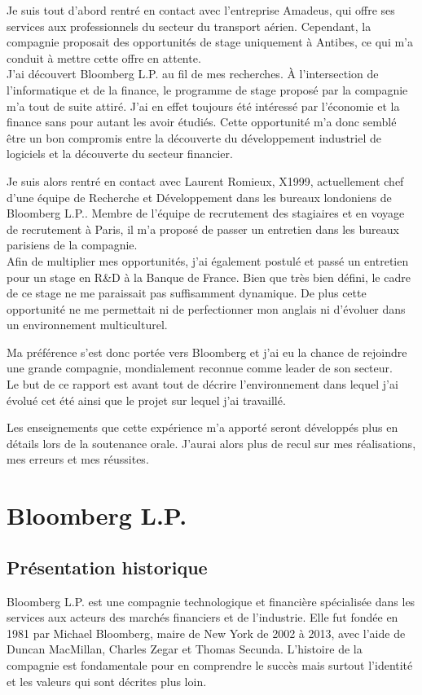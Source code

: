 \documentclass[11pt, oneside, titlepage, a4paper]{article}
\begin{document}
Je suis tout d'abord rentré en contact avec l'entreprise Amadeus, qui offre ses services aux professionnels du secteur du transport aérien. Cependant, la compagnie proposait des opportunités de stage uniquement à Antibes, ce qui m'a conduit à mettre cette offre en attente.
\\

J'ai découvert Bloomberg L.P. au fil de mes recherches. À l'intersection de l'informatique et de la finance, le programme de stage proposé par la compagnie m'a tout de suite attiré. J'ai en effet toujours été intéressé par l'économie et la finance  sans pour autant les avoir étudiés. Cette opportunité m'a donc semblé être un bon compromis entre la découverte du développement industriel de logiciels et la découverte du secteur financier.

Je suis alors rentré en contact avec Laurent Romieux, X1999, actuellement chef d'une équipe de Recherche et Développement dans les bureaux londoniens de Bloomberg L.P.. Membre de l'équipe de recrutement des stagiaires et en voyage de recrutement à Paris, il m'a proposé de passer un entretien dans les bureaux parisiens de la compagnie.
\\

Afin de multiplier mes opportunités, j'ai également postulé et passé un entretien pour un stage en R\&D à la Banque de France. Bien que très bien défini, le cadre de ce stage ne me paraissait pas suffisamment dynamique. De plus cette opportunité ne me permettait ni de perfectionner mon anglais ni d'évoluer dans un environnement multiculturel.

Ma préférence s'est donc portée vers Bloomberg et j'ai eu la chance de rejoindre une grande compagnie, mondialement reconnue comme leader de son secteur. 
\\

Le but de ce rapport est avant tout de décrire l'environnement dans lequel j'ai évolué cet été ainsi que le projet sur lequel j'ai travaillé. 

Les enseignements que cette expérience m'a apporté seront développés plus en détails lors de la soutenance orale. J'aurai alors plus de recul sur mes réalisations, mes erreurs et mes réussites.
\newpage
\section{Bloomberg L.P.}
	\subsection{Présentation historique}
Bloomberg L.P. est une compagnie technologique et financière spécialisée dans les services aux acteurs des marchés financiers et de l'industrie. Elle fut fondée en 1981 par Michael Bloomberg, maire de New York de 2002 à 2013, avec l'aide de Duncan MacMillan, Charles Zegar et Thomas Secunda. L'histoire de la compagnie est fondamentale pour en comprendre le succès mais surtout l'identité et les valeurs qui sont décrites plus loin.
\end{document}
